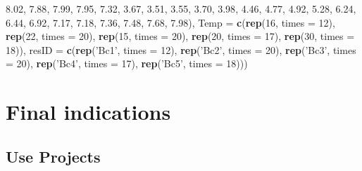 \documentclass[]{book}
\newenvironment{Shaded}{\begin{snugshade}}{\end{snugshade}}
\newcommand{\KeywordTok}[1]{\textcolor[rgb]{0.13,0.29,0.53}{\textbf{#1}}}
\newcommand{\DataTypeTok}[1]{\textcolor[rgb]{0.13,0.29,0.53}{#1}}
\newcommand{\DecValTok}[1]{\textcolor[rgb]{0.00,0.00,0.81}{#1}}
\newcommand{\FloatTok}[1]{\textcolor[rgb]{0.00,0.00,0.81}{#1}}
\newcommand{\StringTok}[1]{\textcolor[rgb]{0.31,0.60,0.02}{#1}}
\newcommand{\NormalTok}[1]{#1}
\theoremstyle{definition}
\theoremstyle{definition}
\theoremstyle{definition}
\theoremstyle{remark}
\begin{document}
\begin{Shaded}
\begin{Highlighting}[]
                            \FloatTok{8.02}\NormalTok{, }\FloatTok{7.88}\NormalTok{, }\FloatTok{7.99}\NormalTok{, }\FloatTok{7.95}\NormalTok{, }\FloatTok{7.32}\NormalTok{, }\FloatTok{3.67}\NormalTok{, }\FloatTok{3.51}\NormalTok{, }\FloatTok{3.55}\NormalTok{,}
                            \FloatTok{3.70}\NormalTok{, }\FloatTok{3.98}\NormalTok{, }\FloatTok{4.46}\NormalTok{, }\FloatTok{4.77}\NormalTok{, }\FloatTok{4.92}\NormalTok{, }\FloatTok{5.28}\NormalTok{, }\FloatTok{6.24}\NormalTok{, }\FloatTok{6.44}\NormalTok{,}
                            \FloatTok{6.92}\NormalTok{, }\FloatTok{7.17}\NormalTok{, }\FloatTok{7.18}\NormalTok{, }\FloatTok{7.36}\NormalTok{, }\FloatTok{7.48}\NormalTok{, }\FloatTok{7.68}\NormalTok{, }\FloatTok{7.98}\NormalTok{),}
                   \DataTypeTok{Temp =} \KeywordTok{c}\NormalTok{(}\KeywordTok{rep}\NormalTok{(}\DecValTok{16}\NormalTok{, }\DataTypeTok{times =} \DecValTok{12}\NormalTok{), }\KeywordTok{rep}\NormalTok{(}\DecValTok{22}\NormalTok{, }\DataTypeTok{times =} \DecValTok{20}\NormalTok{),}
                            \KeywordTok{rep}\NormalTok{(}\DecValTok{15}\NormalTok{, }\DataTypeTok{times =} \DecValTok{20}\NormalTok{), }\KeywordTok{rep}\NormalTok{(}\DecValTok{20}\NormalTok{, }\DataTypeTok{times =} \DecValTok{17}\NormalTok{),}
                            \KeywordTok{rep}\NormalTok{(}\DecValTok{30}\NormalTok{, }\DataTypeTok{times =} \DecValTok{18}\NormalTok{)),}
                   \DataTypeTok{resID =} \KeywordTok{c}\NormalTok{(}\KeywordTok{rep}\NormalTok{(}\StringTok{'Bc1'}\NormalTok{, }\DataTypeTok{times =} \DecValTok{12}\NormalTok{), }\KeywordTok{rep}\NormalTok{(}\StringTok{'Bc2'}\NormalTok{, }\DataTypeTok{times =} \DecValTok{20}\NormalTok{),}
                             \KeywordTok{rep}\NormalTok{(}\StringTok{'Bc3'}\NormalTok{, }\DataTypeTok{times =} \DecValTok{20}\NormalTok{), }\KeywordTok{rep}\NormalTok{(}\StringTok{'Bc4'}\NormalTok{, }\DataTypeTok{times =} \DecValTok{17}\NormalTok{),}
                             \KeywordTok{rep}\NormalTok{(}\StringTok{'Bc5'}\NormalTok{, }\DataTypeTok{times =} \DecValTok{18}\NormalTok{)))}
\end{Highlighting}
\end{Shaded}

\chapter{Final indications}\label{finalindications}

\section{Use Projects}\label{use-projects}
\end{document}
